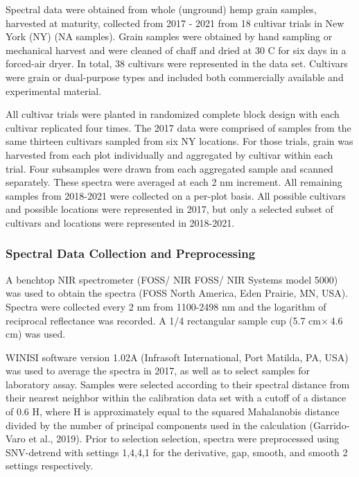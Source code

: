 \documentclass[
]{agujournal2019}
\begin{document}
Spectral data were obtained from whole (unground) hemp grain samples,
harvested at maturity, collected from 2017 - 2021 from 18 cultivar
trials in New York (NY) (NA samples). Grain samples were obtained by
hand sampling or mechanical harvest and were cleaned of chaff and dried
at 30 C for six days in a forced-air dryer. In total, 38 cultivars were
represented in the data set. Cultivars were grain or dual-purpose types
and included both commercially available and experimental material.

All cultivar trials were planted in randomized complete block design
with each cultivar replicated four times. The 2017 data were comprised
of samples from the same thirteen cultivars sampled from six NY
locations. For those trials, grain was harvested from each plot
individually and aggregated by cultivar within each trial. Four
subsamples were drawn from each aggregated sample and scanned
separately. These spectra were averaged at each 2 nm increment. All
remaining samples from 2018-2021 were collected on a per-plot basis. All
possible cultivars and possible locations were represented in 2017, but
only a selected subset of cultivars and locations were represented in
2018-2021.

\subsubsection{Spectral Data Collection and
Preprocessing}\label{spectral-data-collection-and-preprocessing}

A benchtop NIR spectrometer (FOSS/ NIR FOSS/ NIR Systems model 5000) was
used to obtain the spectra (FOSS North America, Eden Prairie, MN, USA).
Spectra were collected every 2 nm from 1100-2498 nm and the logarithm of
reciprocal reflectance was recorded. A 1/4 rectangular sample cup (5.7
cm× 4.6 cm) was used.

WINISI software version 1.02A (Infrasoft International, Port Matilda,
PA, USA) was used to average the spectra in 2017, as well as to select
samples for laboratory assay. Samples were selected according to their
spectral distance from their nearest neighbor within the calibration
data set with a cutoff of a distance of 0.6 H, where H is approximately
equal to the squared Mahalanobis distance divided by the number of
principal components used in the calculation (Garrido-Varo et al.,
2019). Prior to selection selection, spectra were preprocessed using
SNV-detrend with settings 1,4,4,1 for the derivative, gap, smooth, and
smooth 2 settings respectively.
\end{document}
